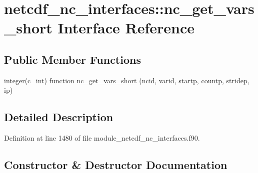 \hypertarget{interfacenetcdf__nc__interfaces_1_1nc__get__vars__short}{}\section{netcdf\+\_\+nc\+\_\+interfaces\+:\+:nc\+\_\+get\+\_\+vars\+\_\+short Interface Reference}
\label{interfacenetcdf__nc__interfaces_1_1nc__get__vars__short}
\subsection*{Public Member Functions}
\begin{DoxyCompactItemize}
\item 
integer(c\+\_\+int) function \hyperlink{interfacenetcdf__nc__interfaces_1_1nc__get__vars__short_aa7e0640225605a47b9959d70e7c62a10}{nc\+\_\+get\+\_\+vars\+\_\+short} (ncid, varid, startp, countp, stridep, ip)
\end{DoxyCompactItemize}


\subsection{Detailed Description}


Definition at line 1480 of file module\+\_\+netcdf\+\_\+nc\+\_\+interfaces.\+f90.



\subsection{Constructor \& Destructor Documentation}
\mbox{\label{interfacenetcdf__nc__interfaces_1_1nc__get__vars__short_aa7e0640225605a47b9959d70e7c62a10}} 
